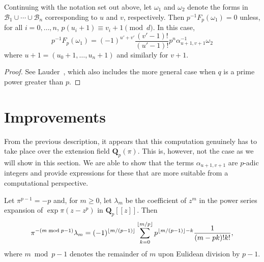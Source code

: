 \begin{thm}
Continuing with the notation set out above, let $\omega_1$ and $\omega_2$ 
denote the forms in $\mathcal{B}_1 \cup \dotsb \cup \mathcal{B}_n$ 
corresponding to $u$ and $v$, respectively.  
Then $p^{-1} F_p (\omega_1) = 0$ unless, for all $i = 0, \dotsc, n$, 
$p (u_i + 1) \equiv v_i + 1 \pmod{d}$.  In this case, 
\begin{equation*}
p^{-1} F_p (\omega_1) = 
    (-1)^{u' + v'} \frac{(v' - 1)!}{(u' - 1)!} p^n \alpha_{u+1,v+1}^{-1} \omega_2
\end{equation*}
where $u + 1 = (u_0 + 1, \dotsc, u_n + 1)$ and similarly for $v + 1$.
\end{thm}

\begin{proof}
See Lauder~\citep[Section~6.1]{Lau04}, which also includes the more 
general case when $q$ is a prime power greater than $p$.
\end{proof}


\section{Improvements}

From the previous description, it appears that this computation 
genuinely has to take place over the extension field 
$\mathbf{Q}_p(\pi)$.  This is, however, not the case as we 
will show in this section.  We are able to show that the terms 
$\alpha_{u+1,v+1}$ are $p$-adic integers and provide expressions 
for these that are more suitable from a computational perspective.  

\begin{lem} \label{lem:lambdam}
Let $\pi^{p-1} = -p$ and, for $m \geq 0$, let $\lambda_m$ 
be the coefficient of $z^m$ in the power series expansion 
of $\exp \pi (z - z^p)$ in $\mathbf{Q}_p[[z]]$.  Then 
\begin{equation*}
\pi^{- (m \bmod {p-1})} \lambda_m = (-1)^{\left\lfloor m/(p-1)\right\rfloor} \sum_{k=0}^{\left\lfloor m/p\right\rfloor} p^{\left\lfloor m/(p-1)\right\rfloor - k} \frac{1}{(m-pk)! k!},
\end{equation*}
where $m \bmod{p-1}$ denotes the remainder of $m$ upon Eulidean 
division by $p-1$.
\end{lem}


